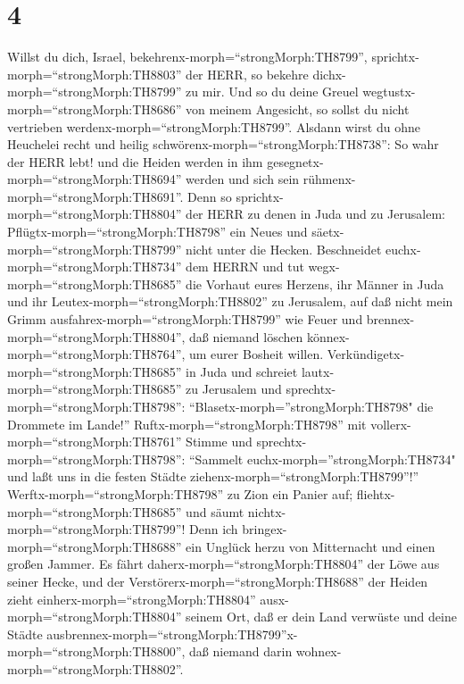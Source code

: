 \hypertarget{section-3}{%
\section{4}\label{section-3}}

 Willst du dich, Israel,
bekehrenx-morph=``strongMorph:TH8799'',
sprichtx-morph=``strongMorph:TH8803'' der HERR, so bekehre
dichx-morph=``strongMorph:TH8799'' zu mir. Und so du deine Greuel
wegtustx-morph=``strongMorph:TH8686'' von meinem Angesicht, so sollst du
nicht vertrieben werdenx-morph=``strongMorph:TH8799''. 
Alsdann wirst du ohne Heuchelei recht und heilig
schwörenx-morph=``strongMorph:TH8738'': So wahr der HERR lebt! und die
Heiden werden in ihm gesegnetx-morph=``strongMorph:TH8694'' werden und
sich sein rühmenx-morph=``strongMorph:TH8691''.  Denn so
sprichtx-morph=``strongMorph:TH8804'' der HERR zu denen in Juda und zu
Jerusalem: Pflügtx-morph=``strongMorph:TH8798'' ein Neues und
säetx-morph=``strongMorph:TH8799'' nicht unter die Hecken. 
Beschneidet euchx-morph=``strongMorph:TH8734'' dem HERRN und tut
wegx-morph=``strongMorph:TH8685'' die Vorhaut eures Herzens, ihr Männer
in Juda und ihr Leutex-morph=``strongMorph:TH8802'' zu Jerusalem, auf
daß nicht mein Grimm ausfahrex-morph=``strongMorph:TH8799'' wie Feuer
und brennex-morph=``strongMorph:TH8804'', daß niemand löschen
könnex-morph=``strongMorph:TH8764'', um eurer Bosheit willen.
 Verkündigetx-morph=``strongMorph:TH8685'' in Juda und
schreiet lautx-morph=``strongMorph:TH8685'' zu Jerusalem und
sprechtx-morph=``strongMorph:TH8798'':
``Blasetx-morph=''strongMorph:TH8798" die Drommete im Lande!''
Ruftx-morph=``strongMorph:TH8798'' mit
vollerx-morph=``strongMorph:TH8761'' Stimme und
sprechtx-morph=``strongMorph:TH8798'': ``Sammelt
euchx-morph=''strongMorph:TH8734" und laßt uns in die festen Städte
ziehenx-morph=``strongMorph:TH8799''!'' 
Werftx-morph=``strongMorph:TH8798'' zu Zion ein Panier auf;
fliehtx-morph=``strongMorph:TH8685'' und säumt
nichtx-morph=``strongMorph:TH8799''! Denn ich
bringex-morph=``strongMorph:TH8688'' ein Unglück herzu von Mitternacht
und einen großen Jammer.  Es fährt
daherx-morph=``strongMorph:TH8804'' der Löwe aus seiner Hecke, und der
Verstörerx-morph=``strongMorph:TH8688'' der Heiden zieht
einherx-morph=``strongMorph:TH8804'' ausx-morph=``strongMorph:TH8804''
seinem Ort, daß er dein Land verwüste und deine Städte
ausbrennex-morph=``strongMorph:TH8799''x-morph=``strongMorph:TH8800'',
daß niemand darin wohnex-morph=``strongMorph:TH8802''. 
